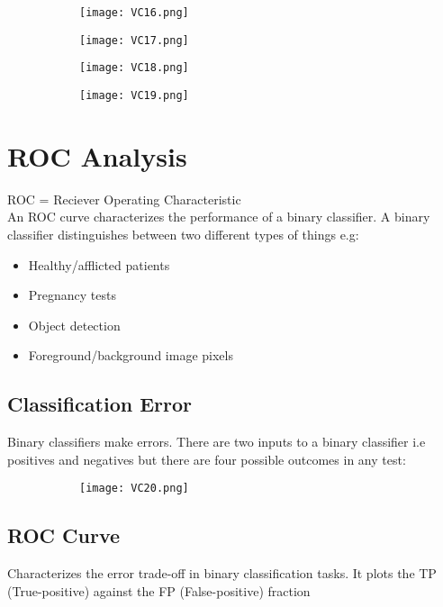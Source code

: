 \documentclass[8pt]{extreport}
\begin{document}
\begin{figure}[H]
\centering
\begin{subfigure}[b]{0.3\linewidth}
\texttt{[image: VC16.png]}
\end{subfigure}
\begin{subfigure}[b]{0.3\linewidth}
\texttt{[image: VC17.png]}
\end{subfigure}
\begin{subfigure}[b]{0.3\linewidth}
\texttt{[image: VC18.png]}
\end{subfigure}
\begin{subfigure}[b]{0.3\linewidth}
\texttt{[image: VC19.png]}
\end{subfigure}
\end{figure}

\section{ROC Analysis}

ROC = Reciever Operating Characteristic\\

An ROC curve characterizes the performance of a binary classifier. A binary classifier distinguishes between two different types of things e.g:
\begin{itemize}
\item Healthy/afflicted patients 
\item Pregnancy tests
\item Object detection
\item Foreground/background image pixels
\end{itemize}

\subsection{Classification Error}
Binary classifiers make errors. There are two inputs to a binary classifier i.e positives and negatives but there are four possible outcomes in any test:
\begin{figure}[H]
\centering
\begin{subfigure}[b]{0.5\linewidth}
\texttt{[image: VC20.png]}
\end{subfigure}
\end{figure}

\subsection{ROC Curve}
Characterizes the error trade-off in binary classification tasks. It plots the TP (True-positive) against the FP (False-positive) fraction
\end{document}
